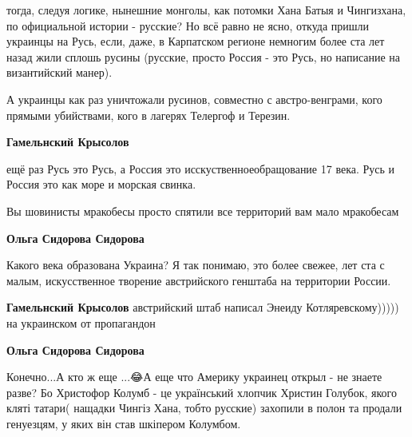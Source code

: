 \begin{itemize}
\begin{itemize}
тогда, следуя логике, нынешние монголы, как потомки Хана Батыя и Чингизхана, по
официальной истории - русские? Но всё равно не ясно, откуда пришли украинцы на
Русь, если, даже, в Карпатском регионе немногим более ста лет назад жили сплошь
русины (русские, просто Россия - это Русь, но написание на византийский манер).

А украинцы как раз уничтожали русинов, совместно с австро-венграми, кого
прямыми убийствами, кого в лагерях Телергоф и Терезин.

 
\textbf{Гамельнский Крысолов} 

ещё раз Русь это Русь, а Россия это исскуственноеобращование 17 века. Русь и
Россия это как море и морская свинка.

Вы шовинисты мракобесы просто спятили все территорий вам мало мракобесам


 
\textbf{Ольга Сидорова Сидорова} 

Какого века образована Украина? Я так понимаю, это более свежее, лет ста с
малым, искусственное творение австрийского генштаба на территории России.

 
\textbf{Гамельнский Крысолов} австрийский штаб написал Энеиду Котляревскому))))) на украинском от пропагандон

 
\textbf{Ольга Сидорова Сидорова}

Конечно...А кто ж еще ...😂А еще что Америку украинец открыл - не знаете разве?
Бо Христофор Колумб - це український хлопчик Христин Голубок, якого кляті
татари( нащадки Чингіз Хана, тобто русские) захопили в полон та продали
генуезцям, у яких він став шкіпером Колумбом.


\end{itemize}
\end{itemize}

